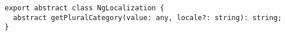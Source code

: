 \begin{verbatim}
export abstract class NgLocalization {
  abstract getPluralCategory(value: any, locale?: string): string;
}
\end{verbatim}
